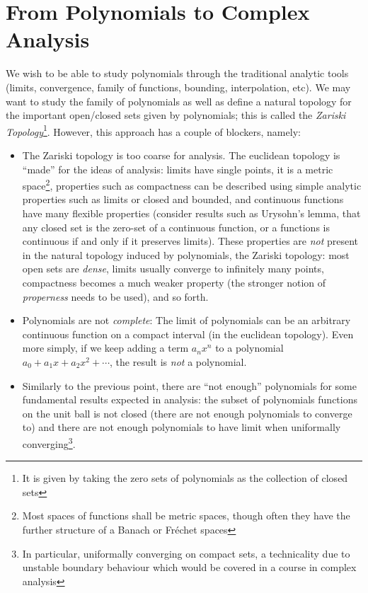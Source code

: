 \documentclass[oneside]{article}
\begin{document}
\section{From Polynomials to Complex Analysis}

We wish to be able to study polynomials through the traditional analytic tools (limits, convergence, family of
functions, bounding, interpolation, etc). We may want to study the family of polynomials as well as define a
natural topology for the important open/closed sets given by polynomials; this is called the
\emph{Zariski Topology}\footnote{It is given by taking the zero sets of polynomials as the collection of
closed sets}. However, this approach has a couple of blockers, namely:

\begin{itemize}
  \item The Zariski topology is too coarse for analysis. The euclidean topology is ``made'' for
    the ideas of analysis: limits have single points, it is a metric space\footnote{Most spaces of functions
    shall be metric spaces, though often they have the further structure of a Banach or Fr\'echet spaces}, properties such as
    compactness can be described using simple analytic properties such as limits or closed and bounded, and
    continuous functions have many flexible properties (consider results such as Urysohn's lemma, that any
    closed set is the zero-set of a continuous function, or a functions is continuous if and only if it
    preserves limits). These properties are \emph{not} present in the natural topology induced by polynomials,
    the Zariski topology: most open sets are \emph{dense}, limits usually converge to infinitely many points,
    compactness becomes a much weaker property (the stronger notion of \emph{properness} needs to be
    used), and so forth.

  \item Polynomials are not \emph{complete}: The limit of polynomials can be an arbitrary continuous function
    on a compact interval (in the euclidean topology). Even more simply, if we keep adding a term $a_nx^n$ to a polynomial $a_0 + a_1x
    + a_2x^2 + \cdots$, the result is \emph{not} a polynomial.
  \item Similarly to the previous point, there are ``not enough'' polynomials for some fundamental results
    expected in analysis: the subset of polynomials functions on the unit ball is not closed (there are not
    enough polynomials to converge to) and there are not enough polynomials to have limit when uniformally
    converging\footnote{In particular, uniformally converging on compact sets, a technicality due to unstable
    boundary behaviour which would be covered in a course in complex analysis}.
\end{itemize}
\end{document}
